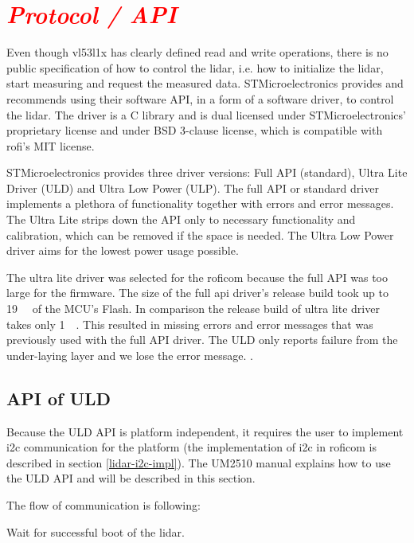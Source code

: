 \documentclass[
  digital,     %
  oneside,     %
  nosansbold,  %
  nocolorbold, %
  lof,         %
  lot,         %
]{fithesis4}
\newcommand{\TODO}[1]{\textcolor{red}{\textit{#1}}}
\begin{document}
\section{ \TODO{Protocol / API} }
Even though \gls{vl53l1x} has clearly defined read and write operations, there is no public specification of how to control the \acrshort{lidar}, i.e. how to initialize the \acrshort{lidar}, start measuring and request the measured data. STMicroelectronics provides and recommends using their software API, in a form of a software driver, to control the \acrshort{lidar}. The driver is a C library and is dual licensed under STMicroelectronics' proprietary license and under BSD 3-clause license, which is compatible with \acrshort{rofi}'s MIT license.

STMicroelectronics provides three driver versions: Full API (standard), Ultra Lite Driver (ULD) and Ultra Low Power (ULP). The full API or standard driver implements a plethora of functionality together with errors and error messages. The Ultra Lite strips down the API only to necessary functionality and calibration, which can be removed if the space is needed. The Ultra Low Power driver aims for the lowest power usage possible.


The ultra lite driver was selected for the \acrshort{roficom} because the full API was too large for the firmware. The size of the full api driver's release build took up to \qty{19}{\kilo\byte} of the MCU's Flash. In comparison the release build of ultra lite driver takes only \qty{1}{\kilo\byte}. This resulted in missing errors and error messages that was previously used with the full API driver. The ULD only reports failure from the under-laying layer and we lose the error message. .

\subsection{API of ULD}
Because the ULD API is platform independent, it requires the user to implement \acrshort{i2c} communication for the platform (the implementation of \acrshort{i2c} in \acrshort{roficom} is described in section \ref{lidar-i2c-impl}). The UM2510 \cite{um2510} manual explains how to use the ULD API and will be described in this section.

The flow of communication is following:

Wait for successful boot of the \acrshort{lidar}.
\end{document}
